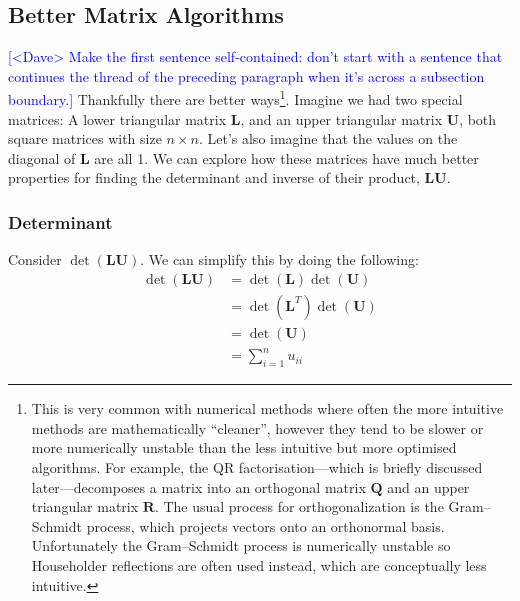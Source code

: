 \documentclass[12pt]{article}
\newcommand{\note}[2][red]{\textcolor{#1}{#2}}
\newcommand{\notedme}[1]{\note[blue]{[<Dave> #1]}}
\begin{document}
\subsection{Better Matrix Algorithms}
\label{lu}

\notedme{Make the first sentence self-contained: don't start with a sentence that continues the thread of the preceding paragraph when it's across a subsection boundary.}
Thankfully there are better ways\footnote{This is very common with numerical methods where often the more intuitive methods are mathematically ``cleaner'', however they tend to be slower or more numerically unstable than the less intuitive but more optimised algorithms. For example, the QR factorisation---which is briefly discussed later---decomposes a matrix into an orthogonal matrix $\mathbf{Q}$ and an upper triangular matrix $\mathbf{R}$. The usual process for orthogonalization is the Gram–Schmidt process, which projects vectors onto an orthonormal basis. Unfortunately the Gram–Schmidt process is numerically unstable so Householder reflections are often used instead, which are conceptually less intuitive.}. Imagine we had two special matrices: A lower triangular matrix $\mathbf{L}$, and an upper triangular matrix $\mathbf{U}$, both square matrices with size $n \times n$. Let's also imagine that the values on the diagonal of $\mathbf{L}$ are all 1. We can explore how these matrices have much better properties for finding the determinant and inverse of their product, $\mathbf{LU}$.

\subsubsection{Determinant}
Consider $\det(\mathbf{LU})$. We can simplify this by doing the following:
\begin{align}
	\det(\mathbf{LU}) &= \det(\mathbf{L}) \det(\mathbf{U}) \label{lu_det_1} \\
	&= \det(\mathbf{L}^T) \det(\mathbf{U}) \label{lu_det_2} \\
	&= \det(\mathbf{U}) \label{lu_det_3} \\
	&= \sum_{i=1}^{n} u_{ii} \label{lu_det_4}
\end{align}
\end{document}
